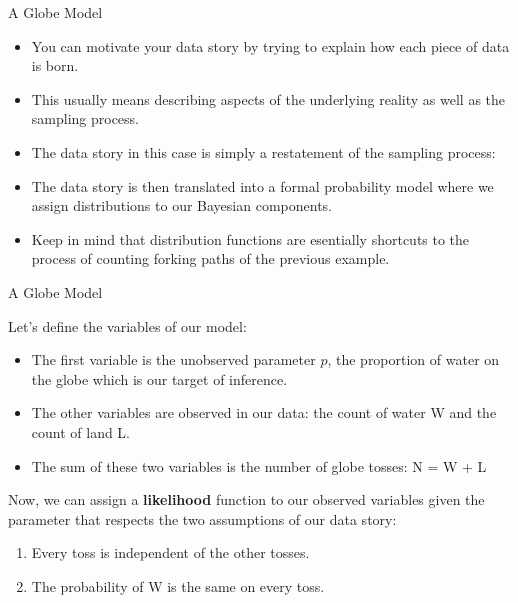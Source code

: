 \documentclass[handout]{beamer}
\begin{document}
\begin{frame}{A Globe Model}
\scriptsize{
\begin{itemize}
\item You can motivate your data story by trying to explain how each piece of data is born. 
\item This usually means describing aspects of the underlying reality as well as the sampling process.
\item The data story in this case is simply a restatement of the sampling process:


\item The data story is then translated into a formal probability model where we assign distributions to our Bayesian components.
\item Keep in mind that distribution functions are esentially shortcuts to the process of counting forking paths of the previous example.
\end{itemize}




} 
 
 

\end{frame}


\begin{frame}{A Globe Model}
\scriptsize{
Let's define the variables of our model:
\begin{itemize}
\item The first variable is the unobserved parameter $p$, the proportion of water on the globe which is our target of inference.
\item The other variables are observed in our data: the count of water W and the count of land L. 
\item The sum of these two variables is the number of globe tosses: N = W + L
\end{itemize}
Now, we can assign a \textbf{likelihood} function  to our observed variables given the parameter that respects the two assumptions of our data story:
\begin{enumerate}
 \item  Every toss is independent of the other tosses.
 \item The probability of W is the same on every toss.
\end{enumerate}
} 
 
 

\end{frame}
\end{document}
